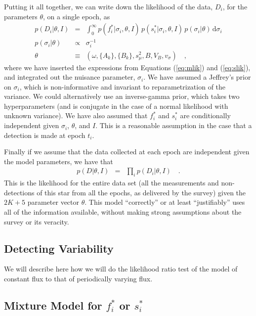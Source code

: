 \documentclass[12pt,preprint]{aastex}
\newcommand{\dd}{\mathrm{d}}
\newcommand{\fobs}{f_i^*}
\newcommand{\sobs}{s_i^*}
\begin{document}
Putting it all together, we can write down the likelihood of the data, $D_i$, for the parameters $\theta$, on a single epoch, as
\begin{eqnarray}\displaystyle
p(D_i|\theta,I) &=& \int_0^{\infty} p(\fobs |\sigma_i,\theta,I)\, p(\sobs |\sigma_i,\theta,I)\, p(\sigma_i | \theta)\,\dd \sigma_i
\\
p(\sigma_i|\theta) &\propto& \sigma_i^{-1}
\\
\theta &\equiv& (\omega, \{A_k\}, \{B_k\}, s_\mu^2, B, V_B ,v_\sigma) \quad ,
\end{eqnarray}
where we have inserted the expressions from Equations (\ref{eq:mlik}) and (\ref{eq:slik}), and integrated out the nuisance parameter, $\sigma_i$.  We have assumed a Jeffrey's prior on $\sigma_i$, which is non-informative and invariant to reparametrization of the variance.  We could alternatively use an inverse-gamma prior, which takes two hyperparameters (and is conjugate in the case of a normal likelihood with unknown variance).  We have also assumed that $\fobs$ and $\sobs$ are conditionally independent given $\sigma_i$, $\theta$, and $I$.  This is a reasonable assumption in the case that a detection is made at epoch $t_i$.


Finally if we assume that the data collected at each epoch are independent given the model parameters, we have that
\begin{eqnarray}\displaystyle
p(D|\theta,I) &=& \prod_i p(D_i|\theta,I)
\quad.
\end{eqnarray}
This is the likelihood for the entire
data set (all the measurements and non-detections of this star from
all the epochs, as delivered by the survey) given the $2K + 5$ parameter vector $\theta$.  This model
``correctly'' or at least ``justifiably'' uses all of the information
available, without making strong assumptions about the survey or its
veracity.


\subsection{Detecting Variability}

We will describe here how we will do the likelihood ratio test of the model of constant flux to that of periodically varying flux.


\subsection{Mixture Model for $\fobs$ or $\sobs$}
\end{document}
